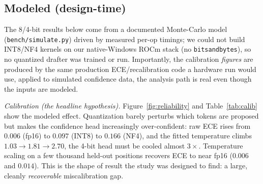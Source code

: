 \documentclass[11pt]{article}
\theoremstyle{plain}
\theoremstyle{definition}
\begin{document}
\subsection{Modeled (design-time)}
\label{sec:eval-model}
The 8/4-bit results below come from a documented Monte-Carlo model
(\texttt{bench/simulate.py}) driven by measured per-op timings; we could not build
INT8/NF4 kernels on our native-Windows ROCm stack (no \texttt{bitsandbytes}),
so no quantized drafter was trained or run. Importantly, the calibration
\emph{figures} are produced by the same production ECE/recalibration code a
hardware run would use, applied to simulated confidence data, the analysis path
is real even though the inputs are modeled.

\emph{Calibration (the headline hypothesis).} Figure~\ref{fig:reliability} and
Table~\ref{tab:calib} show the modeled effect. Quantization barely perturbs which
tokens are proposed but makes the confidence head increasingly over-confident: raw
ECE rises from $0.006$ (fp16) to $0.097$ (INT8) to $0.166$ (NF4), and the fitted
temperature climbs $1.03\to1.81\to2.70$, the 4-bit head must be cooled almost
$3\times$. Temperature scaling on a few thousand held-out positions recovers ECE
to near fp16 ($0.006$ and $0.014$). This is the shape of result the study was
designed to find: a large, cleanly \emph{recoverable} miscalibration gap.
\end{document}
